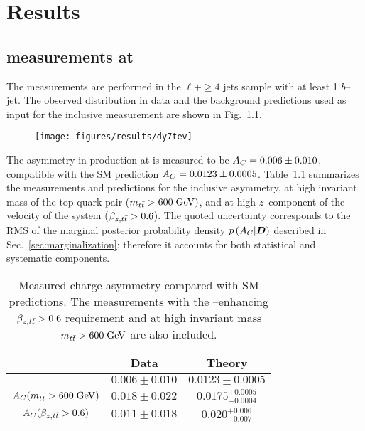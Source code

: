 \chapter{Results}
\label{sec:results}


\section{\ac{} measurements at \seventev{}}
\label{sec:res7tev}

The measurements are performed in the $\ell{}+\ge4$ jets sample with at least 1
$b$--jet. The observed \dy{} distribution in data and the background
predictions used as input for the inclusive measurement are shown in
Fig.~\ref{fig:dy7tev}.

\begin{figure}[!htb]\centering
  \texttt{[image: figures/results/dy7tev]} 
  \caption{}
  \label{fig:dy7tev}
\end{figure}

The asymmetry \ac{} in \ttbar{} production at \seventev{} is measured to be
$A_C{}= 0.006\pm0.010$, compatible with the SM prediction
$A_C{}=0.0123\pm0.0005$.
Table~\ref{tab:results} summarizes the
measurements and predictions for the inclusive asymmetry, at high
invariant mass of the top quark pair ($m_{t\bar{t}}{} >600 \; \mathrm{GeV}{})$, and at
high $z$--component of the velocity of the \ttbar{} system ($\beta_{z,t\bar{t}}{}>0.6$).
The quoted uncertainty corresponds to the RMS of the marginal posterior
probability density $p\left(A_C{}|\boldsymbol{D}{}\right)$ described in
Sec.~\ref{sec:marginalization}; therefore it accounts for both
statistical and systematic components.

\begin{table}[!htb]\centering
\begin{tabular}{c c c}
\toprule
  & Data & Theory\\
\midrule
 \ac{}                                     & $0.006\pm0.010$ & $0.0123\pm0.0005$ \\
 $A_C{}(m_{t\bar{t}}{} > 600 \; \mathrm{GeV}{})$ & $0.018\pm0.022$ & $0.0175^{+0.0005}_{-0.0004}$\\
 $A_C{}(\beta_{z,t\bar{t}}>0.6)$   & $0.011\pm0.018$ & $0.020^{+0.006}_{-0.007}$\\
\bottomrule
\end{tabular}
\caption{Measured charge asymmetry \ac{} compared with SM
  predictions. The measurements with the \qqbar{}--enhancing
  $\beta_{z,t\bar{t}} > 0.6$ requirement and at high \ttbar{} invariant
  mass $m_{t\bar{t}}{} > 600 \; \mathrm{GeV}{}$ are also included.}
\label{tab:results}
\end{table}

